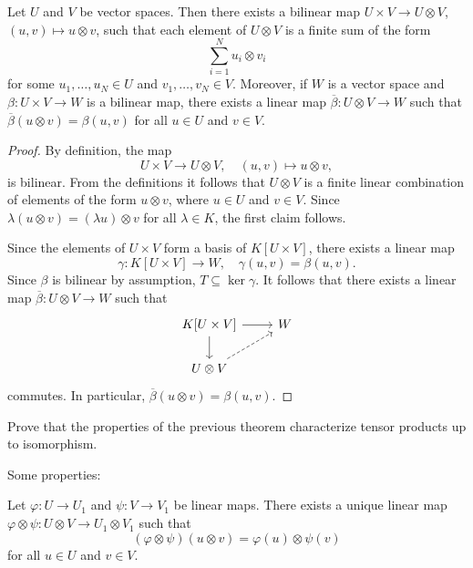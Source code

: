 \begin{theorem}
	Let $U$ and $V$ be vector spaces. Then there exists a bilinear map 
	$U\times V\to U\otimes V$, $(u,v)\mapsto u\otimes v$, such that 
	each element of $U\otimes V$ is a finite sum of the form 
	\[
		\sum_{i=1}^N u_i\otimes v_i
	\]
	for some $u_1,\dots,u_N\in U$ and $v_1,\dots,v_N\in V$. 
	Moreover, if $W$ is a vector space and $\beta\colon U\times V\to W$ is a bilinear map, 
	there exists a linear map 
	$\overline{\beta}\colon U\otimes V\to W$ such that $\overline{\beta}(u\otimes
	v)=\beta(u,v)$ for all $u\in U$ and $v\in V$.
\end{theorem}

\begin{proof}
    By definition, the map
    \[
	U\times V\to U\otimes V,\quad
	(u,v)\mapsto u\otimes v,
	\]
	is bilinear. From the definitions it follows that
	$U\otimes V$ is a finite linear combination of elements of the form 
	$u\otimes v$, where $u\in U$ and $v\in V$. Since $\lambda(u\otimes
	v)=(\lambda u)\otimes v$ for all $\lambda\in K$, the first claim follows.

	Since the elements of $U\times V$ form a basis of $K[U\times V]$, there exists
	a linear map 
	\[
		\gamma\colon K[U\times V]\to W,\quad
	\gamma(u,v)=\beta(u,v). 
	\]
	Since $\beta$ is bilinear by assumption, $T\subseteq\ker\gamma$. It follows that there exists 
	a linear map $\overline{\beta}\colon U\otimes V\to
	W$ such that  
	\[
	\begin{tikzcd}
		K[U\times V] \arrow[r]\arrow[d] & W \\
		U\otimes V\arrow[ur, dashrightarrow]
	\end{tikzcd}
	\]
	commutes. In particular, $\overline{\beta}(u\otimes v)=\beta(u,v)$. 
\end{proof}

\begin{exercise}
	\label{xca:tensorial_unicidad}
	Prove that the properties of the previous theorem characterize tensor products up to isomorphism. 
\end{exercise}

Some properties:

\begin{proposition}
	Let $\varphi\colon U\to U_1$ and $\psi\colon V\to V_1$ be linear maps. There
	exists a unique linear map 
	$\varphi\otimes\psi\colon U\otimes V\to U_1\otimes V_1$ such that
	\[
		(\varphi\otimes\psi)(u\otimes v)=\varphi(u)\otimes\psi(v)
	\]
	for all $u\in U$ and $v\in V$.
\end{proposition}

